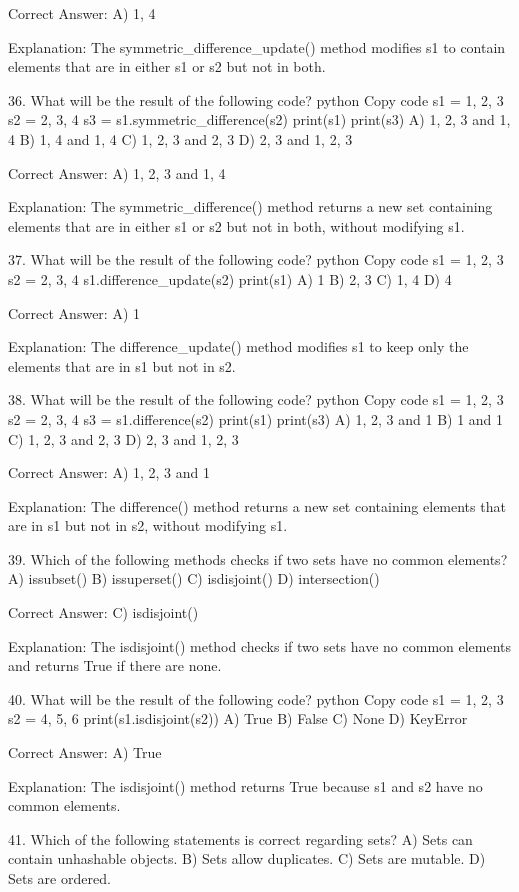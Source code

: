 Correct Answer: A) {1, 4}

Explanation:
The symmetric_difference_update() method modifies s1 to contain elements that are in either s1 or s2 but not in both.

36. What will be the result of the following code?
python
Copy code
s1 = {1, 2, 3}
s2 = {2, 3, 4}
s3 = s1.symmetric_difference(s2)
print(s1)
print(s3)
A) {1, 2, 3} and {1, 4}
B) {1, 4} and {1, 4}
C) {1, 2, 3} and {2, 3}
D) {2, 3} and {1, 2, 3}

Correct Answer: A) {1, 2, 3} and {1, 4}

Explanation:
The symmetric_difference() method returns a new set containing elements that are in either s1 or s2 but not in both, without modifying s1.

37. What will be the result of the following code?
python
Copy code
s1 = {1, 2, 3}
s2 = {2, 3, 4}
s1.difference_update(s2)
print(s1)
A) {1}
B) {2, 3}
C) {1, 4}
D) {4}

Correct Answer: A) {1}

Explanation:
The difference_update() method modifies s1 to keep only the elements that are in s1 but not in s2.

38. What will be the result of the following code?
python
Copy code
s1 = {1, 2, 3}
s2 = {2, 3, 4}
s3 = s1.difference(s2)
print(s1)
print(s3)
A) {1, 2, 3} and {1}
B) {1} and {1}
C) {1, 2, 3} and {2, 3}
D) {2, 3} and {1, 2, 3}

Correct Answer: A) {1, 2, 3} and {1}

Explanation:
The difference() method returns a new set containing elements that are in s1 but not in s2, without modifying s1.

39. Which of the following methods checks if two sets have no common elements?
A) issubset()
B) issuperset()
C) isdisjoint()
D) intersection()

Correct Answer: C) isdisjoint()

Explanation:
The isdisjoint() method checks if two sets have no common elements and returns True if there are none.

40. What will be the result of the following code?
python
Copy code
s1 = {1, 2, 3}
s2 = {4, 5, 6}
print(s1.isdisjoint(s2))
A) True
B) False
C) None
D) KeyError

Correct Answer: A) True

Explanation:
The isdisjoint() method returns True because s1 and s2 have no common elements.

41. Which of the following statements is correct regarding sets?
A) Sets can contain unhashable objects.
B) Sets allow duplicates.
C) Sets are mutable.
D) Sets are ordered.

